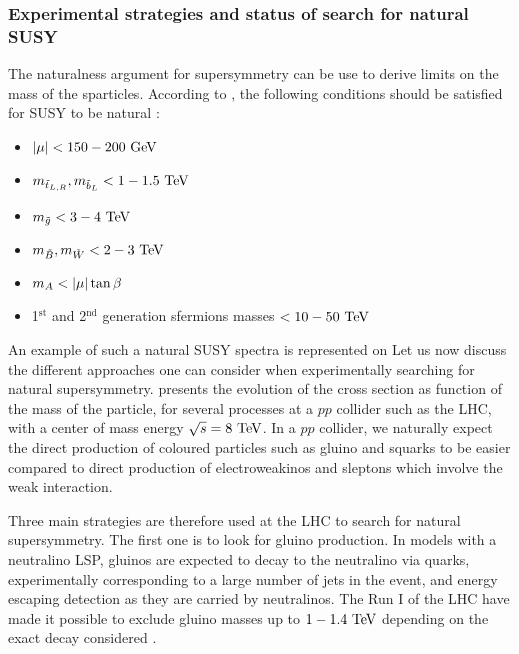         \subsubsection{Experimental strategies and status of search for natural SUSY}

        The naturalness argument for supersymmetry can be use to derive limits on the mass
        of the sparticles. According to \cite{NaturalSUSYAndDarkMatter}, the following
        conditions should be satisfied for SUSY to be natural :
        \begin{itemize}
            \item $\left| \mu \right| < 150-200 ~\text{GeV}$
            \item $m_{\tilde{t}_{L,R}}, m_{\tilde{b}_L} < 1-1.5~\text{TeV}$
            \item $m_{\tilde{g}} < 3-4~\text{TeV}$
            \item $m_{\tilde{B}}, m_{\tilde{W}} < 2-3~\text{TeV}$
            \item $m_{A} < \left| \mu \right| \tan \beta$
            \item 1$^\text{st}$ and 2$^\text{nd}$ generation sfermions masses $< 10-50~\text{TeV}$
        \end{itemize}



        An example of such a natural SUSY spectra is represented on 
        Let us now discuss the different approaches one can consider when experimentally
        searching for natural supersymmetry.  presents the evolution
        of the cross section as function of the mass of the particle, for several processes
        at a $pp$ collider such as the LHC, with a center of mass energy $\sqrt{s} = 8~\text{TeV}$.
        In a $pp$ collider, we naturally expect the direct production of coloured particles
        such as gluino and squarks to be easier compared to direct production of electroweakinos
        and sleptons which involve the weak interaction.

        Three main strategies are therefore used at the LHC to search for natural supersymmetry.
        The first one is to look for gluino production. In models with a neutralino LSP, gluinos
        are expected to decay to the neutralino via quarks, experimentally corresponding to a large number
        of jets in the event, and energy escaping detection as they are carried by neutralinos.
        The Run I of the LHC have made it possible to exclude gluino masses up to $1-1.4~\text{TeV}$
        depending on the exact decay considered \cite{CMS-SUS-14-011, ATLASGluino}.

